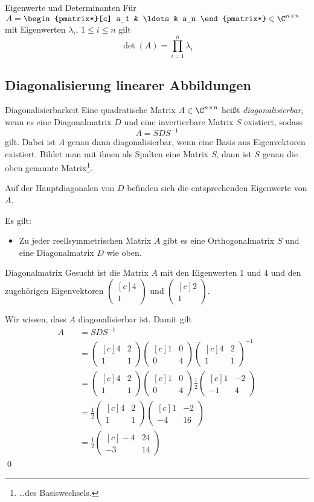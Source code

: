 \documentclass[german]{../spicker}
\newcommand{\vektor}[1]{\begin{pmatrix*}[c] #1 \end{pmatrix*}}
\begin{document}
\begin{bonus}{Eigenwerte und Determinanten}
    Für $A = \vektor{a_1 & \ldots & a_n} \in \C^{n\times n}$ mit Eigenwerten $\lambda_i$, $1 \leq i \leq n$ gilt
    $$
        \det(A) = \prod^n_{i=1}\lambda_i
    $$
\end{bonus}

\subsection{Diagonalisierung linearer Abbildungen}

\begin{defi}{Diagonalisierbarkeit}
    Eine quadratische Matrix $A \in \C^{n\times n}$ heißt \emph{diagonalisierbar}, wenn es eine Diagonalmatrix $D$ und eine invertierbare Matrix $S$ existiert, sodass
    $$
        A = SDS^{-1}
    $$
    gilt.
    Dabei ist $A$ genau dann diagonalisierbar, wenn eine Basis aus Eigenvektoren existiert.
    Bildet man mit ihnen als Spalten eine Matrix $S$, dann ist $S$ genau die oben genannte Matrix\footnote{\ldots des Basiswechsels.}.

    Auf der Hauptdiagonalen von $D$ befinden sich die entsprechenden Eigenwerte von $A$.

    Es gilt:
    \begin{itemize}
        \item Zu jeder reellsymmetrischen Matrix $A$ gibt es eine Orthogonalmatrix $S$ und eine Diagonalmatrix $D$ wie oben.
    \end{itemize}
\end{defi}

\begin{example}{Diagonalmatrix}
    Gesucht ist die Matrix $A$ mit den Eigenwerten $1$ und $4$ und den zugehörigen Eigenvektoren $\vektor{4\\1}$ und $\vektor{2\\1}$.

    \exampleseparator

    Wir wissen, dass $A$ diagonalisierbar ist.
    Damit gilt
    $$
        \begin{aligned}
            A & \quad = SDS^{-1}                    \\
              & \quad = \vektor{4              & 2  \\ 1 & 1} \vektor{1 & 0 \\ 0 & 4} \vektor{4 & 2 \\ 1 & 1}^{-1} \\
              & \quad = \vektor{4              & 2  \\ 1 & 1} \vektor{1 & 0 \\ 0 & 4} \frac{1}{2} \vektor{1 & -2 \\ -1 & 4} \\
              & \quad = \frac{1}{2} \vektor{4  & 2  \\ 1 & 1} \vektor{1 & -2 \\ -4 & 16} \\
              & \quad = \frac{1}{2} \vektor{-4 & 24 \\ -3 & 14}
        \end{aligned}
    $$\qed
\end{example}
\end{document}
